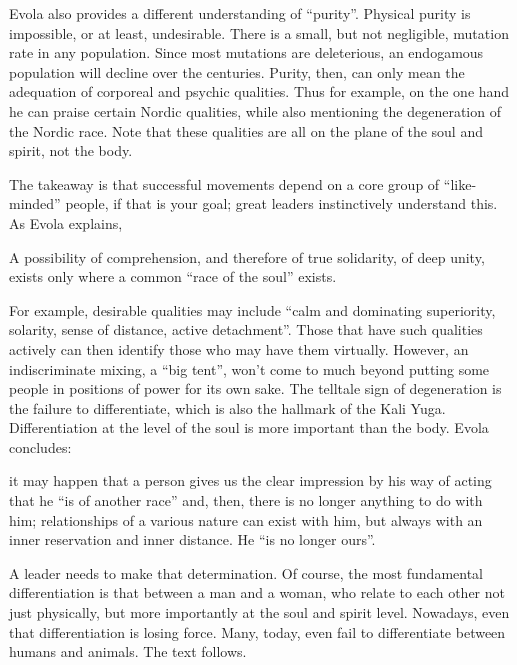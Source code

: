 Evola also provides a different understanding of ``purity''. Physical purity is impossible, or at least, undesirable. There is a small, but not negligible, mutation rate in any population. Since most mutations are deleterious, an endogamous population will decline over the centuries. Purity, then, can only mean the adequation of corporeal and psychic qualities. Thus for example, on the one hand he can praise certain Nordic qualities, while also mentioning the degeneration of the Nordic race. Note that these qualities are all on the plane of the soul and spirit, not the body.

The takeaway is that successful movements depend on a core group of ``like-minded'' people, if that is your goal; great leaders instinctively understand this. As Evola explains,

\begin{quotex}
A possibility of comprehension, and therefore of true solidarity, of deep unity, exists only where a common ``race of the soul'' exists.
\end{quotex}


For example, desirable qualities may include ``calm and dominating superiority, solarity, sense of distance, active detachment''. Those that have such qualities actively can then identify those who may have them virtually. However, an indiscriminate mixing, a ``big tent'', won't come to much beyond putting some people in positions of power for its own sake. The telltale sign of degeneration is the failure to differentiate, which is also the hallmark of the Kali Yuga. Differentiation at the level of the soul is more important than the body. Evola concludes:

\begin{quotex}
it may happen that a person gives us the clear impression by his way of acting that he ``is of another race'' and, then, there is no longer anything to do with him; relationships of a various nature can exist with him, but always with an inner reservation and inner distance. He ``is no longer ours''.
\end{quotex}


A leader needs to make that determination. Of course, the most fundamental differentiation is that between a man and a woman, who relate to each other not just physically, but more importantly at the soul and spirit level. Nowadays, even that differentiation is losing force. Many, today, even fail to differentiate between humans and animals. The text follows.

